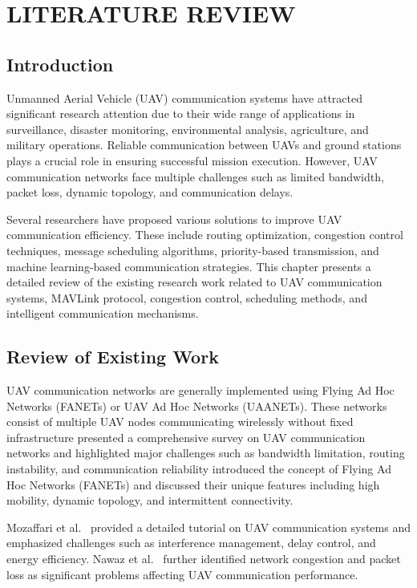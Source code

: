 \chapter{LITERATURE REVIEW}

\section{Introduction}

Unmanned Aerial Vehicle (UAV) communication systems have attracted
significant research attention due to their wide range of applications
in surveillance, disaster monitoring, environmental analysis,
agriculture, and military operations. Reliable communication between
UAVs and ground stations plays a crucial role in ensuring successful
mission execution. However, UAV communication networks face multiple
challenges such as limited bandwidth, packet loss, dynamic topology,
and communication delays.

Several researchers have proposed various solutions to improve UAV
communication efficiency. These include routing optimization,
congestion control techniques, message scheduling algorithms,
priority-based transmission, and machine learning-based communication
strategies. This chapter presents a detailed review of the existing
research work related to UAV communication systems, MAVLink protocol,
congestion control, scheduling methods, and intelligent communication
mechanisms.


\section{Review of Existing Work}

UAV communication networks are generally implemented using Flying
Ad Hoc Networks (FANETs) or UAV Ad Hoc Networks (UAANETs). These
networks consist of multiple UAV nodes communicating wirelessly
without fixed infrastructure\cite{gupta2016surveyuav}
presented a comprehensive survey on UAV communication networks and
highlighted major challenges such as bandwidth limitation, routing
instability, and communication reliability\cite{bekmezci2013flying} introduced the concept of Flying
Ad Hoc Networks (FANETs) and discussed their unique features
including high mobility, dynamic topology, and intermittent
connectivity.

Mozaffari et al.~\cite{mozaffari2019tutorial} provided a detailed tutorial on UAV communication systems and emphasized challenges
such as interference management, delay control, and energy
efficiency. Nawaz et al.~\cite{nawaz2021uav} further identified
network congestion and packet loss as significant problems affecting
UAV communication performance.


